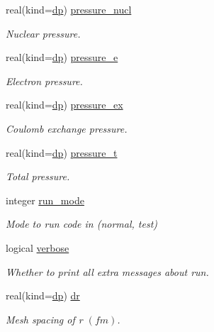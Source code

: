 \begin{DoxyCompactItemize}
real(kind=\mbox{\hyperlink{namespaceparameters_a52f8c6351fd79345d8811e065bcbbb37}{dp}}) \mbox{\hyperlink{group__WS__PROPERTIES_ga769d654b2408c30dca03771d09945c2a}{pressure\+\_\+nucl}}
\begin{DoxyCompactList}\small\item\em Nuclear pressure. \end{DoxyCompactList}\item 
real(kind=\mbox{\hyperlink{namespaceparameters_a52f8c6351fd79345d8811e065bcbbb37}{dp}}) \mbox{\hyperlink{group__WS__PROPERTIES_ga72c16e4c25186b788d7d47eb8c87c3a4}{pressure\+\_\+e}}
\begin{DoxyCompactList}\small\item\em Electron pressure. \end{DoxyCompactList}\item 
real(kind=\mbox{\hyperlink{namespaceparameters_a52f8c6351fd79345d8811e065bcbbb37}{dp}}) \mbox{\hyperlink{group__WS__PROPERTIES_gab531cc7fbabd91f11cc2be7385cb5854}{pressure\+\_\+ex}}
\begin{DoxyCompactList}\small\item\em Coulomb exchange pressure. \end{DoxyCompactList}\item 
real(kind=\mbox{\hyperlink{namespaceparameters_a52f8c6351fd79345d8811e065bcbbb37}{dp}}) \mbox{\hyperlink{group__WS__PROPERTIES_gaf485019c788a68c4915fca156d59baa1}{pressure\+\_\+t}}
\begin{DoxyCompactList}\small\item\em Total pressure. \end{DoxyCompactList}\item 
integer \mbox{\hyperlink{group__INPUT__PARS_ga2b7774a07afe51f9f1e547e3104833e4}{run\+\_\+mode}}
\begin{DoxyCompactList}\small\item\em Mode to run code in (normal, test) \end{DoxyCompactList}\item 
logical \mbox{\hyperlink{group__INPUT__PARS_ga552f372a0ff4dff467424c48bedd6b49}{verbose}}
\begin{DoxyCompactList}\small\item\em Whether to print all extra messages about run. \end{DoxyCompactList}\item 
real(kind=\mbox{\hyperlink{namespaceparameters_a52f8c6351fd79345d8811e065bcbbb37}{dp}}) \mbox{\hyperlink{group__INPUT__PARS_gaa5f574e72af23ebd482368e0a7232ea1}{dr}}
\begin{DoxyCompactList}\small\item\em Mesh spacing of r $(fm)$. \end{DoxyCompactList}\item 

\end{DoxyCompactItemize}
